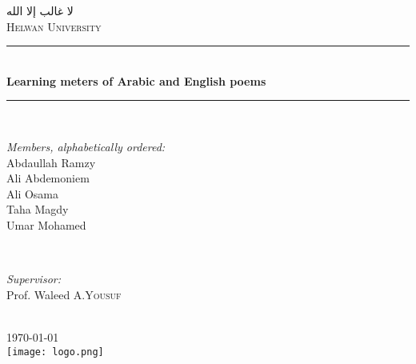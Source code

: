 \documentclass[12pt]{article}
\begin{document}
\begin{titlepage}

\newcommand{\HRule}{\rule{\linewidth}{0.5mm}} %

\center %
 

\textsc{\Large \textarabic{لا غالب إلا الله}}\\[0.9cm] %
\textsc{\LARGE Helwan University}\\[1.5cm] %


\HRule \\[0.4cm]
{ \LARGE \bfseries Learning meters of Arabic and English poems}\\[0.4cm] %
\HRule \\[1.5cm]
 

\begin{minipage}{0.4\textwidth}
\begin{flushleft} \large
\emph{Members, \textit{\small alphabetically ordered}:}\\

\small{Abdaullah Ramzy}\\
\small{Ali Abdemoniem}\\
\small{Ali Osama}\\
\small{Taha Magdy}\\
\small{Umar Mohamed}\\
\end{flushleft}
\end{minipage}
~
\begin{minipage}{0.4\textwidth}
\begin{flushright} \large
\emph{Supervisor:} \\
Prof. Waleed A.\textsc{Yousuf} %
\end{flushright}
\end{minipage}\\[2cm]



{\large \today}\\[2cm] %

\texttt{[image: logo.png]}\\[1cm] %

\vfill %

\end{titlepage}
\end{document}
